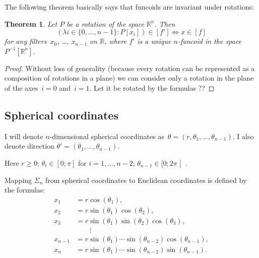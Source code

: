 \documentclass[oneside,draft]{amsart}
\newcommand{\suprel}[1]{\left[#1\right]}
\newtheorem{thm}{Theorem}
\begin{document}
The following theorem basically says that funcoids are invariant under rotations:

\begin{thm}
Let $P$ be a rotation of the space $\mathbb{R}^n$. Then
\[ (\lambda i\in\{0,\dots,n-1\}:P[x_i])\in\suprel{f'} \Leftrightarrow x\in\suprel{f} \]
for any filters~$x_0$, \dots, $x_{n-1}$ on $\mathbb{R}$,
where $f'$ is a unique $n$-fun\-co\-id in the space $P^{-1}[\mathbb{R}^n]$.
\end{thm}

\begin{proof}
Without loss of generality (because every rotation can be represented as a composition of rotations in a plane) we can consider only a rotation in the plane of the axes~$i=0$ and~$i=1$. Let it be rotated by the formulas ??
\end{proof}


\subsection{Spherical coordinates}

I will denote $n$-dimensional spherical coordinates as~$\theta=(r, \theta_1,\dots,\theta_{n-1})$.
I also denote direction $\theta'=(\theta_1,\dots,\theta_{n-1})$.

Here $r\geq 0$; $\theta_i\in[0;\pi]$ for $i=1,\dots,n-2$; $\theta_{n-1}\in[0;2\pi\mathclose[$ .

Mapping $\Sigma_n$ from spherical coordinates to Euclidean coordinates is defined by the formulas:
\[
\begin{aligned}x_{1}&=r\cos(\theta _{1}),\\x_{2}&=r\sin(\theta _{1})\cos(\theta _{2}),\\x_{3}&=r\sin(\theta _{1})\sin(\theta _{2})\cos(\theta _{3}),\\&\qquad \vdots \\x_{n-1}&=r\sin(\theta _{1})\cdots \sin(\theta _{n-2})\cos(\theta _{n-1}),\\x_{n}&=r\sin(\theta _{1})\cdots \sin(\theta _{n-2})\sin(\theta _{n-1}).\end{aligned}
\]
\end{document}
